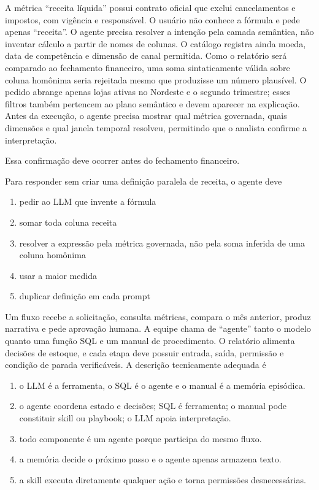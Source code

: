 \documentclass[12pt,a4paper]{article}
\begin{document}

\TextoBase

A métrica ``receita líquida'' possui contrato oficial que exclui cancelamentos e impostos, com vigência e responsável. O usuário não conhece a fórmula e pede apenas ``receita''. O agente precisa resolver a intenção pela camada semântica, não inventar cálculo a partir de nomes de colunas. O catálogo registra ainda moeda, data de competência e dimensão de canal permitida. Como o relatório será comparado ao fechamento financeiro, uma soma sintaticamente válida sobre coluna homônima seria rejeitada mesmo que produzisse um número plausível. O pedido abrange apenas lojas ativas no Nordeste e o segundo trimestre; esses filtros também pertencem ao plano semântico e devem aparecer na explicação. Antes da execução, o agente precisa mostrar qual métrica governada, quais dimensões e qual janela temporal resolveu, permitindo que o analista confirme a interpretação.

Essa confirmação deve ocorrer antes do fechamento financeiro.

\FonteDidatica

\Comando Para responder sem criar uma definição paralela de receita, o agente deve

\begin{enumerate}[label=\Alph*)]
  \item pedir ao LLM que invente a fórmula
  \item somar toda coluna receita
  \item resolver a expressão pela métrica governada, não pela soma inferida de uma coluna homônima
  \item usar a maior medida
  \item duplicar definição em cada prompt
\end{enumerate}

\TextoBase
Um fluxo recebe a solicitação, consulta métricas, compara o mês anterior, produz narrativa e pede aprovação humana. A equipe chama de ``agente'' tanto o modelo quanto uma função SQL e um manual de procedimento.
O relatório alimenta decisões de estoque, e cada etapa deve possuir entrada, saída, permissão e condição de parada verificáveis.
\FonteDidatica
\Comando A descrição tecnicamente adequada é
\begin{enumerate}[label=\Alph*)]
  \item o LLM é a ferramenta, o SQL é o agente e o manual é a memória episódica.
  \item o agente coordena estado e decisões; SQL é ferramenta; o manual pode constituir skill ou playbook; o LLM apoia interpretação.
  \item todo componente é um agente porque participa do mesmo fluxo.
  \item a memória decide o próximo passo e o agente apenas armazena texto.
  \item a skill executa diretamente qualquer ação e torna permissões desnecessárias.
\end{enumerate}
\end{document}
